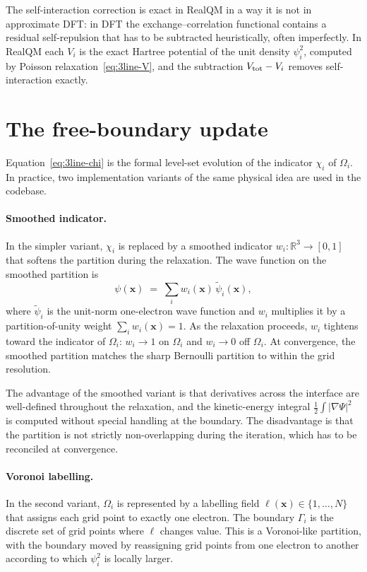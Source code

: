 The self-interaction correction is exact in RealQM in a way it is not in approximate DFT: in DFT the exchange--correlation functional contains a residual self-repulsion that has to be subtracted heuristically, often imperfectly. In RealQM each $V_i$ is the exact Hartree potential of the unit density $\psi_i^2$, computed by Poisson relaxation~\eqref{eq:3line-V}, and the subtraction $V_{\rm tot} - V_i$ removes self-interaction exactly.

\section{The free-boundary update}\label{sec:bernoulli-update}

Equation~\eqref{eq:3line-chi} is the formal level-set evolution of the indicator $\chi_i$ of $\Omega_i$. In practice, two implementation variants of the same physical idea are used in the codebase.

\paragraph{Smoothed indicator.} In the simpler variant, $\chi_i$ is replaced by a smoothed indicator $w_i : \mathbb{R}^3 \to [0, 1]$ that softens the partition during the relaxation. The wave function on the smoothed partition is
\[
\psi(\mathbf{x}) \;=\; \sum_i w_i(\mathbf{x})\, \tilde\psi_i(\mathbf{x}),
\]
where $\tilde\psi_i$ is the unit-norm one-electron wave function and $w_i$ multiplies it by a partition-of-unity weight $\sum_i w_i(\mathbf{x}) = 1$. As the relaxation proceeds, $w_i$ tightens toward the indicator of $\Omega_i$: $w_i \to 1$ on $\Omega_i$ and $w_i \to 0$ off $\Omega_i$. At convergence, the smoothed partition matches the sharp Bernoulli partition to within the grid resolution.

The advantage of the smoothed variant is that derivatives across the interface are well-defined throughout the relaxation, and the kinetic-energy integral $\tfrac{1}{2} \int |\nabla \Psi|^2$ is computed without special handling at the boundary. The disadvantage is that the partition is not strictly non-overlapping during the iteration, which has to be reconciled at convergence.

\paragraph{Voronoi labelling.} In the second variant, $\Omega_i$ is represented by a labelling field $\ell(\mathbf{x}) \in \{1, \ldots, N\}$ that assigns each grid point to exactly one electron. The boundary $\Gamma_i$ is the discrete set of grid points where $\ell$ changes value. This is a Voronoi-like partition, with the boundary moved by reassigning grid points from one electron to another according to which $\psi_i^2$ is locally larger.

